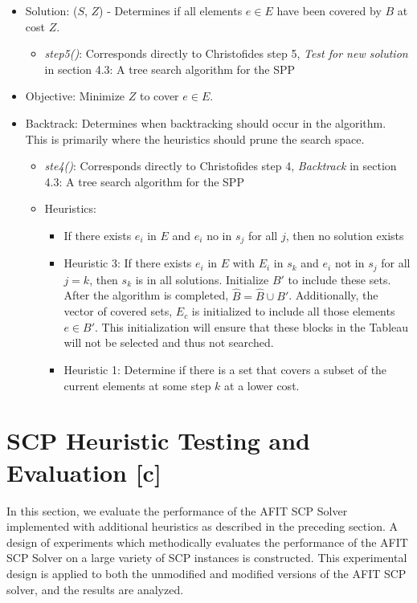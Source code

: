 \documentclass[12pt]{article}
\begin{document}
\begin{itemize}
\begin{itemize}
		\end{itemize}
		\item Solution: ($S$, $Z$) - Determines if all elements $e \in E$ have been covered by $B$ at cost $Z$.
		\begin{itemize}
			\item \textit{step5()}: Corresponds directly to Christofides step 5, \textit{Test for new solution} in section 4.3: A tree search algorithm for the SPP
		\end{itemize}
		\item Objective: Minimize $Z$ to cover $e \in E$.
		\item Backtrack: Determines when backtracking should occur in the algorithm. This is primarily where the heuristics should prune the search space.
		\begin{itemize}
			\item \textit{ste4()}: Corresponds directly to Christofides step 4, \textit{Backtrack} in section 4.3: A tree search algorithm for the SPP
			\item Heuristics:
			\begin{itemize}
				\item If there exists $e_i$ in $E$ and $e_i$ no in $s_j$ for all $j$, then no solution exists
				\item Heuristic 3: If there exists $e_i$ in $E$ with $E_i$ in $s_k$ and $e_i$ not in $s_j$ for all $j = k$, then $s_k$ is in all solutions. Initialize $B\prime$ to include these sets. After the algorithm is completed, $\hat{B} = \hat{B} \cup B\prime$. Additionally, the vector of covered sets, $E_c$ is initialized to include all those elements $e \in B\prime$. This initialization will ensure that these blocks in the Tableau will not be selected and thus not searched.
				\item Heuristic 1: Determine if there is a set that covers a subset of the current elements at some step $k$ at a lower cost.
			\end{itemize}
		\end{itemize}
	\end{itemize}
	
	
	\section{SCP Heuristic Testing and Evaluation [c]} \label{scn:testing}
	
	In this section, we evaluate the performance of the AFIT SCP Solver implemented with additional heuristics as described in the preceding section. A design of experiments which methodically evaluates the performance of the AFIT SCP Solver on a large variety of SCP instances is constructed. This experimental design is applied to both the unmodified and modified versions of the AFIT SCP solver, and the results are analyzed. 
	
\end{document}

